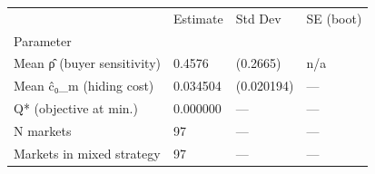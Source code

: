 \begin{tabular}{llll}
\toprule
 & Estimate & Std Dev & SE (boot) \\
Parameter &  &  &  \\
\midrule
Mean ρ̂  (buyer sensitivity) & 0.4576 & (0.2665) & n/a \\
Mean ĉ₀\_m  (hiding cost) & 0.034504 & (0.020194) & — \\
Q*  (objective at min.) & 0.000000 & — & — \\
N markets & 97 & — & — \\
  Markets in mixed strategy & 97 & — & — \\
\bottomrule
\end{tabular}
